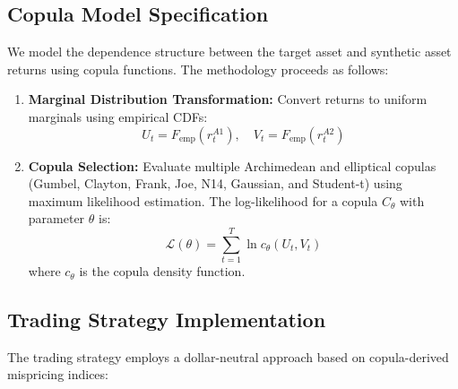 \subsection{Copula Model Specification}
We model the dependence structure between the target asset and synthetic asset returns using copula functions. The methodology proceeds as follows:

\begin{enumerate}
    \item \textbf{Marginal Distribution Transformation:} Convert returns to uniform marginals using empirical CDFs:
    \begin{equation}
        U_t = F_{\text{emp}}(r_t^{A1}), \quad V_t = F_{\text{emp}}(r_t^{A2})
    \end{equation}
    
    \item \textbf{Copula Selection:} Evaluate multiple Archimedean and elliptical copulas (Gumbel, Clayton, Frank, Joe, N14, Gaussian, and Student-t) using maximum likelihood estimation. The log-likelihood for a copula $ C_\theta $ with parameter $ \theta $ is:
    \begin{equation}
        \mathcal{L}(\theta) = \sum_{t=1}^T \ln c_\theta(U_t, V_t)
    \end{equation}
    where $ c_\theta $ is the copula density function.
\end{enumerate}

\subsection{Trading Strategy Implementation}
The trading strategy employs a dollar-neutral approach based on copula-derived mispricing indices:


